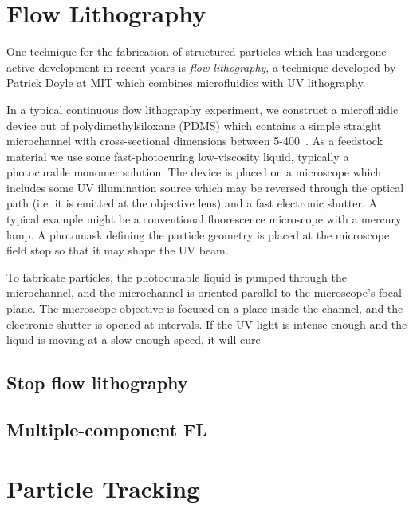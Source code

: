 \section{Flow Lithography}

One technique for the fabrication of structured particles which has undergone active development in recent years is 
\textit{flow lithography}, a technique developed by Patrick Doyle at MIT which combines microfluidics with 
UV lithography.

In a typical continuous flow lithography experiment, we construct a microfluidic device out of polydimethylsiloxane (PDMS)
which contains a simple straight microchannel with cross-sectional dimensions between 5-400~\microns. As a feedstock
material we use some fast-photocuring low-viscosity liquid, typically a photocurable monomer solution. The device is 
placed on a microscope which includes some UV illumination source which may be reversed through the optical path (i.e.
it is emitted at the objective lens) and a fast electronic shutter. A typical example might be a conventional 
fluorescence microscope with a mercury lamp.  A photomask defining the particle geometry is placed at the microscope
field stop so that it may shape the UV beam.

To fabricate particles, the photocurable liquid is pumped through the microchannel, and the microchannel is oriented
parallel to the microscope's focal plane. The microscope objective is focused on a place inside the channel, and the
electronic shutter is opened at intervals. If the UV light is intense enough and the liquid is moving at a slow enough speed,
it will cure 

\subsection{Stop flow lithography}

\subsection{Multiple-component FL}

\section{Particle Tracking}

\begin{itemize}
\end{itemize}
